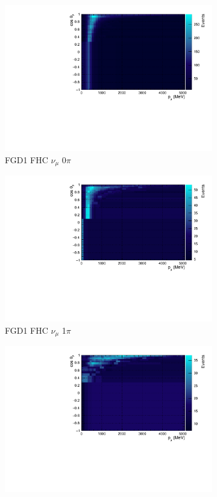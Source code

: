 \begin{figure}
\centering
\begin{subfigure}{.32\textwidth}
  \centering
  \includegraphics[width=0.95\linewidth]{figs/TH2Poly_MC_FGD1_numuCC_0pi}
  \caption{FGD1 FHC $\nu_{\mu}$ 0$\pi$}
  \label{fig:th2polyFGD1_numuCC_0pi}
\end{subfigure}
\begin{subfigure}{.32\textwidth}
  \centering
  \includegraphics[width=0.95\linewidth]{figs/TH2Poly_MC_FGD1_numuCC_1pi}
  \caption{FGD1 FHC $\nu_{\mu}$ 1$\pi$}
  \label{fig:th2polyFGD1_numuCC_1pi}
\end{subfigure}
\begin{subfigure}{.32\textwidth}
  \centering
  \includegraphics[width=0.95\linewidth]{figs/TH2Poly_MC_FGD1_numuCC_other}

\end{subfigure}
\end{figure}

